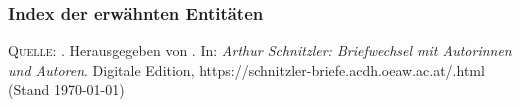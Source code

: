 \bigskip

\normalsize

\newenvironment{esempio}[3]%
{
    \vspace{1.5ex}
    \rlap{\underline{#1}}
    \par
    \setlength{\parindent}{0cm}
    \nopagebreak
    \leftskip=#2cm
    \rightskip=#3cm
}
{
    \par
}

\bigskip

\footnotesize

\subsubsection*{Index der erwähnten Entitäten}

\printindex



\vspace{3cm}

\vfill

\footnotesize
\textsc{Quelle}: \titel. Herausgegeben von {\editorInnen}. In: \emph{Arthur Schnitzler: Briefwechsel mit Autorinnen und Autoren}.
 Digitale Edition, https://schnitzler-briefe.acdh.oeaw.ac.at/{\dateiname}.html (Stand \today)
 


